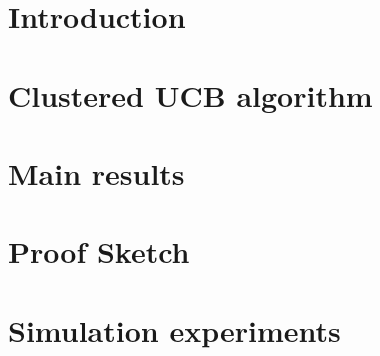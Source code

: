 \documentclass[twoside]{article}
\begin{document}
\begin{abstract}

\end{abstract}

\section{Introduction}
\label{sec:intro}


\section{Clustered UCB algorithm}
\label{sec:clusucb}


\section{Main results}
\label{sec:results}


\section{Proof Sketch}
\label{sec:proofSketch}


\section{Simulation experiments}
\label{sec:expts}

\end{document}
